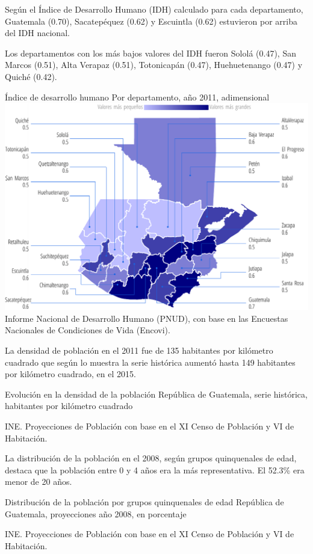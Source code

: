 %
{%
	Según el Índice de Desarrollo Humano (IDH) calculado para cada departamento, Guatemala (0.70), Sacatepéquez (0.62) y Escuintla (0.62) estuvieron por arriba del IDH nacional.
	
	Los departamentos con los más bajos valores del IDH fueron Sololá (0.47), San Marcos (0.51), Alta Verapaz (0.51), Totonicapán (0.47), Huehuetenango (0.47) y  Quiché (0.42).}%
{%
	Índice de desarrollo humano
}%
{%
	Por departamento, año 2011, adimensional} %
{%
	\includegraphics[width=52\cuadri]{graficas/1_11.pdf}}%
{ Informe Nacional de Desarrollo Humano (PNUD), con base en las Encuestas Nacionales de Condiciones de Vida (Encovi).} %




%
{%
	La densidad de población en el 2011 fue de 135 habitantes por kilómetro cuadrado que según lo muestra la serie histórica aumentó hasta 149 habitantes por kilómetro cuadrado, en el 2015.

}%
{%
	Evolución en la densidad de la población} %
{%
	República de Guatemala, serie histórica, habitantes por kilómetro cuadrado} %
{%
	\begin{tikzpicture}[x=1pt,y=1pt]    \end{tikzpicture}}%
{%
	INE. Proyecciones de Población con base en el XI Censo de Población y VI de Habitación.} %






%
{%
	
	La distribución de la población en el 2008, según grupos quinquenales de edad, destaca que la población entre 0 y 4 años era la más representativa. El 52.3\% era menor de 20 años.
}%
{%
	Distribución de la población por grupos quinquenales de edad} %
{%
	República de Guatemala, proyecciones año 2008, en porcentaje} %
{%
	\begin{tikzpicture}[x=1pt,y=1pt]    \end{tikzpicture}}%
{INE. Proyecciones de Población con base en el XI Censo de Población y VI de Habitación.} %

